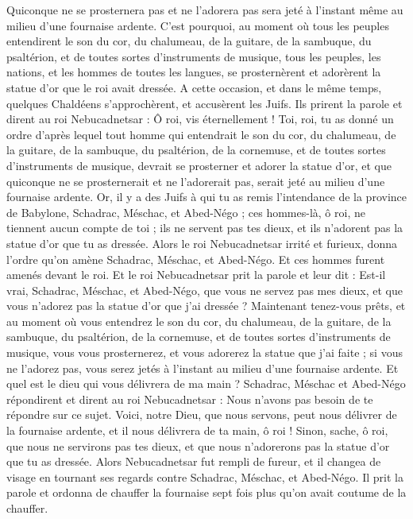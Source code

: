 \begin{multicols}{2}
Quiconque ne se prosternera pas et ne l’adorera pas sera jeté à l’instant même au milieu d’une fournaise ardente.
C'est pourquoi, au moment où tous les peuples entendirent le son du cor, du chalumeau, de la guitare, de la sambuque, du psaltérion, et de toutes sortes d’instruments de musique, tous les peuples, les nations, et les hommes de toutes les langues, se prosternèrent et adorèrent la statue d'or que le roi avait dressée.
A cette occasion, et dans le même temps, quelques Chaldéens s'approchèrent, et accusèrent les Juifs.
Ils prirent la parole et dirent au roi Nebucadnetsar : Ô roi, vis éternellement !
Toi, roi, tu as donné un ordre d’après lequel tout homme qui entendrait le son du cor, du chalumeau, de la guitare, de la sambuque, du psaltérion, de la cornemuse, et de toutes sortes d’instruments de musique, devrait se prosterner et adorer la statue d'or,
et que quiconque ne se prosternerait et ne l’adorerait pas, serait jeté au milieu d’une fournaise ardente.
Or, il y a des Juifs à qui tu as remis l’intendance de la province de Babylone, Schadrac, Méschac, et Abed-Négo ; ces hommes-là, ô roi, ne tiennent aucun compte de toi ; ils ne servent pas tes dieux, et ils n’adorent pas la statue d'or que tu as dressée.
Alors le roi Nebucadnetsar irrité et furieux, donna l’ordre qu'on amène Schadrac, Méschac, et Abed-Négo. Et ces hommes furent amenés devant le roi.
Et le roi Nebucadnetsar prit la parole et leur dit : Est-il vrai, Schadrac, Méschac, et Abed-Négo, que vous ne servez pas mes dieux, et que vous n’adorez pas la statue d'or que j'ai dressée ?
Maintenant tenez-vous prêts, et au moment où vous entendrez le son du cor, du chalumeau, de la guitare, de la sambuque, du psaltérion, de la cornemuse, et de toutes sortes d’instruments de musique, vous vous prosternerez, et vous adorerez la statue que j'ai faite ; si vous ne l’adorez pas, vous serez jetés à l’instant au milieu d’une fournaise ardente. Et quel est le dieu qui vous délivrera de ma main ?
Schadrac, Méschac et Abed-Négo répondirent et dirent au roi Nebucadnetsar : Nous n’avons pas besoin de te répondre sur ce sujet.
Voici, notre Dieu, que nous servons, peut nous délivrer de la fournaise ardente, et il nous délivrera de ta main, ô roi !
Sinon, sache, ô roi, que nous ne servirons pas tes dieux, et que nous n’adorerons pas la statue d'or que tu as dressée.
Alors Nebucadnetsar fut rempli de fureur, et il changea de visage en tournant ses regards contre Schadrac, Méschac, et Abed-Négo. Il prit la parole et ordonna de chauffer la fournaise sept fois plus qu’on avait coutume de la chauffer.

\end{multicols}
